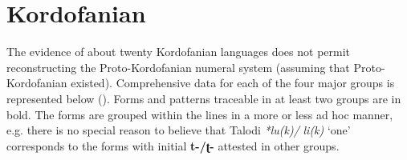 \newpage 
\section{Kordofanian}%

The evidence of about twenty Kordofanian languages does not permit reconstructing the Proto-Kordofa\-nian numeral system (assuming that Proto-Kordofanian existed). Comprehensive data for each of the four major groups is represented below (). Forms and patterns traceable in at least two groups are in bold. The forms are grouped within the lines in a more or less ad hoc manner, e.g. there is no special reason to believe that Talodi \textit{*lu(k)/} \textit{li(k)} ‘one’ corresponds to the forms with initial \textbf{t-/ʈ-} attested in other groups.



